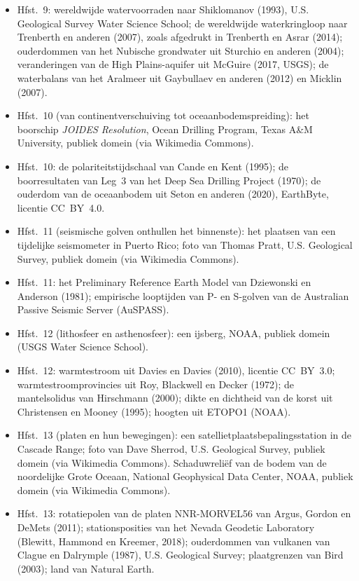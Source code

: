 \begin{itemize}
  \item Hfst.~9: wereldwijde watervoorraden naar Shiklomanov (1993), U.S. Geological Survey Water Science School; de wereldwijde waterkringloop naar Trenberth en anderen (2007), zoals afgedrukt in Trenberth en Asrar (2014); ouderdommen van het Nubische grondwater uit Sturchio en anderen (2004); veranderingen van de High Plains-aquifer uit McGuire (2017, USGS); de waterbalans van het Aralmeer uit Gaybullaev en anderen (2012) en Micklin (2007).
  \item Hfst.~10 (van continentverschuiving tot oceaanbodemspreiding): het boorschip \emph{JOIDES Resolution}, Ocean Drilling Program, Texas A\&M University, publiek domein (via Wikimedia Commons).
  \item Hfst.~10: de polariteitstijdschaal van Cande en Kent (1995); de boorresultaten van Leg~3 van het Deep Sea Drilling Project (1970); de ouderdom van de oceaanbodem uit Seton en anderen (2020), EarthByte, licentie CC~BY~4.0.
  \item Hfst.~11 (seismische golven onthullen het binnenste): het plaatsen van een tijdelijke seismometer in Puerto Rico; foto van Thomas Pratt, U.S. Geological Survey, publiek domein (via Wikimedia Commons).
  \item Hfst.~11: het Preliminary Reference Earth Model van Dziewonski en Anderson (1981); empirische looptijden van P- en S-golven van de Australian Passive Seismic Server (AuSPASS).
  \item Hfst.~12 (lithosfeer en asthenosfeer): een ijsberg, NOAA, publiek domein (USGS Water Science School).
  \item Hfst.~12: warmtestroom uit Davies en Davies (2010), licentie CC~BY~3.0; warmtestroomprovincies uit Roy, Blackwell en Decker (1972); de mantelsolidus van Hirschmann (2000); dikte en dichtheid van de korst uit Christensen en Mooney (1995); hoogten uit ETOPO1 (NOAA).
  \item Hfst.~13 (platen en hun bewegingen): een satellietplaatsbepalingsstation in de Cascade Range; foto van Dave Sherrod, U.S. Geological Survey, publiek domein (via Wikimedia Commons). Schaduwreliëf van de bodem van de noordelijke Grote Oceaan, National Geophysical Data Center, NOAA, publiek domein (via Wikimedia Commons).
  \item Hfst.~13: rotatiepolen van de platen NNR-MORVEL56 van Argus, Gordon en DeMets (2011); stationsposities van het Nevada Geodetic Laboratory (Blewitt, Hammond en Kreemer, 2018); ouderdommen van vulkanen van Clague en Dalrymple (1987), U.S. Geological Survey; plaatgrenzen van Bird (2003); land van Natural Earth.

\end{itemize}

